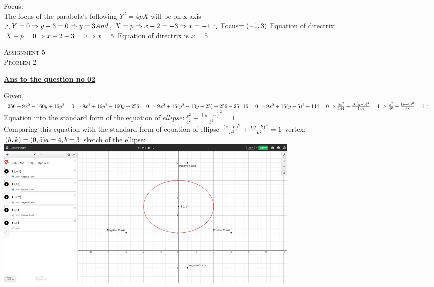 \documentclass{article}
\begin{document}
\begin{newpage}
{Focus: \\[3mm]
The focus of the parabola's following $Y^2=4pX$ will be on x axis\\[3mm]
$\therefore Y=0\\[3mm] \Rightarrow y-3=0\\[3mm] \Rightarrow y=3\\[3mm]
And$, $X=p\Rightarrow x-2=-3 \Rightarrow x=-1\\[3mm]
\therefore$ Focus$=(-1,3)\\[3mm]$
Equation of directrix:\\[3mm]
$X+p=0\\[3mm] \Rightarrow x-2-3=0\\[3mm] \Rightarrow x=5\\[3mm]$
Equation of directrix is $x=5$ \\[3mm]}
\end{newpage}
\begin{newpage}
    \begin{flushright}
    \textsc{Assignment 5}\\
    \textsc{Problem 2}\\
    [1 cm]
    \end{flushright}
\begin{center}
  \textbf{\Large \underline {Ans to the question no 02}}\\
  [0.5 cm]
\end{center}
\Large {Given, \\[3mm]
$256+9x^2-160y+16y^2=0\\[3mm]
\Rightarrow 9x^2+16y^2-160y+256=0 \\[3mm]
\Rightarrow 9x^2+16(y^2-10y+25)+256-25\cdot 16=0 \\[3mm]
\Rightarrow 9x^2+16(y-5)^2+144=0 \\[3mm]
\Rightarrow \frac{9x^2}{144}+\frac{16(y-5)^2}{144}=1 \\[3mm]
\Rightarrow \frac{x^2}{4^2}+\frac{(y-5)^2}{3^2}=1 \\[3mm]
\therefore$ Equation into the standard form of the equation of $ ellipse:\frac{x^2}{4^2}+\frac{(y-5)^2}{3^2}=1$\\[3mm]
Comparing this equation with the standard form of equation of ellipse $\frac{(x-h)^2}{a^2}+ \frac{(y-k)^2}{b^2}=1\\[3mm]$
vertex:\\[3mm]
$(h,k)=(0,5)\\[3mm]
a=4, b=3\\[10 cm]$
sketch of the ellipse: \\[3mm]}
\includegraphics[width=15cm]{sketch question 2}
\end{newpage}
\end{document}
